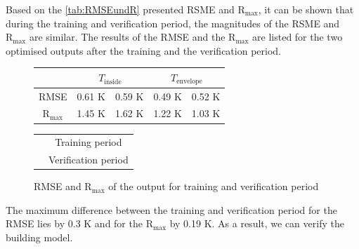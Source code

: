     Based on the \autoref{tab:RMSEundR} presented RSME and $\mathrm{R}_\text{max}$, it can be shown that during the training and verification period, the magnitudes of the RSME and $\mathrm{R}_\text{max}$ are similar. The results of the RMSE and the $\mathrm{R}_\text{max}$ are listed for the two optimised outputs after the training and the verification period.
     \begin{figure}[h]
    \begin{minipage}[t]{0.5\textwidth}
    \vspace{0pt}
        \begin{tabular}{c|c|c|c|c}
             & \multicolumn{2}{|c}{$T_\text{inside}$} & \multicolumn{2}{|c}{$T_\text{envelope}$} \\
             \hline
            RMSE & \cellcolor{gray} 0.61 K & \cellcolor{gray90} 0.59 K & \cellcolor{gray} 0.49 K & \cellcolor{gray90} 0.52 K \\
            $\mathrm{R}_\text{max}$ &\cellcolor{gray} 1.45 K & \cellcolor{gray90} 1.62 K & \cellcolor{gray} 1.22 K & \cellcolor{gray90} 1.03 K
        \end{tabular}
    \end{minipage}
    \hfill
    \begin{minipage}[t]{0.5\textwidth}
    \vspace{0pt}
        \begin{tabular}{c c}
        \\
            &\cellcolor{gray} Training period \\
           &\cellcolor{gray90} Verification period
        \end{tabular}
    \end{minipage}
    \caption{RMSE and $\mathrm{R}_\text{max}$ of the output for training and verification period}
    \label{tab:RMSEundR}
    \end{figure}
    The maximum difference between the training and verification period for the RMSE lies by 0.3 K and for the $\mathrm{R}_\text{max}$ by 0.19 K. As a result, we can verify the building model. \newline

